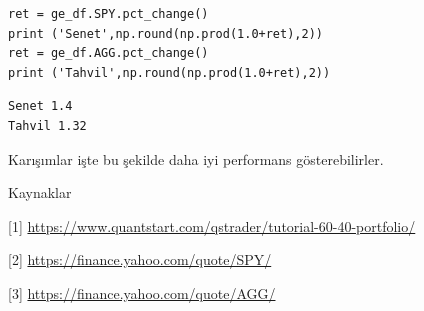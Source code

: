 \documentclass[12pt,fleqn]{article}\usepackage{../../common}
\begin{document}
\begin{verbatim}
ret = ge_df.SPY.pct_change()
print ('Senet',np.round(np.prod(1.0+ret),2))
ret = ge_df.AGG.pct_change()
print ('Tahvil',np.round(np.prod(1.0+ret),2))
\end{verbatim}

\begin{verbatim}
Senet 1.4
Tahvil 1.32
\end{verbatim}

Karışımlar işte bu şekilde daha iyi performans gösterebilirler.

Kaynaklar

[1] \url{https://www.quantstart.com/qstrader/tutorial-60-40-portfolio/}

[2] \url{https://finance.yahoo.com/quote/SPY/}

[3] \url{https://finance.yahoo.com/quote/AGG/}
  
\end{document}
